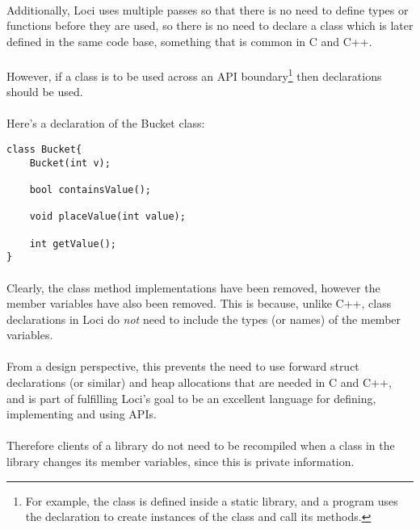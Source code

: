 \documentclass[12pt,twoside,notitlepage]{report}
\begin{document}
\paragraph{}
Additionally, Loci uses multiple passes so that there is no need to define types or functions before they are used, so there is no need to declare a class which is later defined in the same code base, something that is common in C and C++.

\paragraph{}
However, if a class is to be used across an API boundary\footnote{For example, the class is defined inside a static library, and a program uses the declaration to create instances of the class and call its methods.} then declarations should be used.

\paragraph{}
Here's a declaration of the Bucket class:

\small{
\begin{verbatim}
class Bucket{
    Bucket(int v);

    bool containsValue();
    
    void placeValue(int value);
    
    int getValue();
}
\end{verbatim}
}

\paragraph{}
Clearly, the class method implementations have been removed, however the member variables have also been removed. This is because, unlike C++, class declarations in Loci do \emph{not} need to include the types (or names) of the member variables.

\paragraph{}
From a design perspective, this prevents the need to use forward struct declarations (or similar) and heap allocations that are needed in C and C++, and is part of fulfilling Loci's goal to be an excellent language for defining, implementing and using APIs.

\paragraph{}
Therefore clients of a library do not need to be recompiled when a class in the library changes its member variables, since this is private information.
\end{document}
